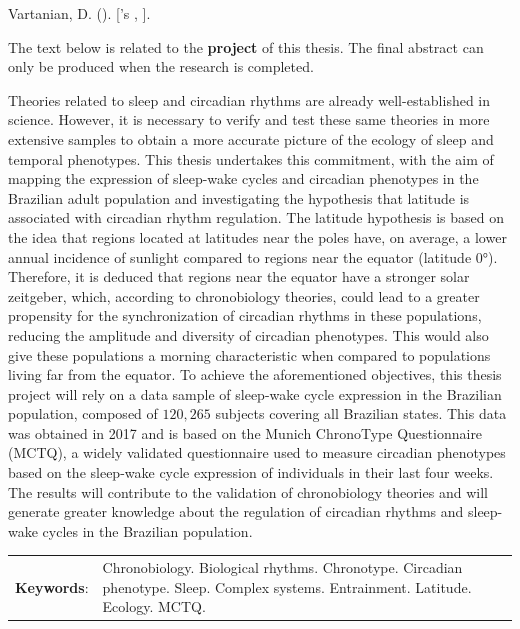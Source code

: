 \documentclass[
12pt,
openright,
oneside,
a4paper,
chapter=TITLE,
section=TITLE,
french,
spanish,
brazil,
english
]{abntex2}\usepackage{array}
\renewcommand{\resumoname}{Abstract}
\renewcommand{\resumoname}{Resumo}
\renewcommand{\resumoname}{Resumen}
\renewcommand{\resumoname}{Résumé}
\providecommand{\imprimiruniversidade}{}
\providecommand{\imprimirtipodetituloacademico}{}
\newenvironment{resumoenv}[1][\resumoname]{
  \pretextualchapter{#1}
  \begingroup
  \setlength{\parindent}{0cm}
  \setlength{\parskip}{\smallskipamount} %
  \AtBeginEnvironment{tabular}{\normalsize}
  \renewcommand{\arraystretch}{1}
  \setlength{\aboverulesep}{0ex}
  \setlength{\belowrulesep}{0ex}
  \setlength{\arrayrulewidth}{0pt}
  \setlength{\tabcolsep}{0cm}
  \vspace{-\smallskipamount} %
  \begin{SingleSpace}
}{
  \end{SingleSpace}
  \cleardoublepage
  \endgroup
}
\begin{document}
\begin{resumoenv}[\resumoname]
Vartanian, D. ({\imprimirdata}). \textit{\imprimirtitulo} [{\imprimirtipodetituloacademico}'s {\imprimirtipotrabalho}, {\imprimiruniversidade}].


The text below is related to the \textbf{project} of this thesis. The
final abstract can only be produced when the research is completed.

Theories related to sleep and circadian rhythms are already
well-established in science. However, it is necessary to verify and test
these same theories in more extensive samples to obtain a more accurate
picture of the ecology of sleep and temporal phenotypes. This thesis
undertakes this commitment, with the aim of mapping the expression of
sleep-wake cycles and circadian phenotypes in the Brazilian adult
population and investigating the hypothesis that latitude is associated
with circadian rhythm regulation. The latitude hypothesis is based on
the idea that regions located at latitudes near the poles have, on
average, a lower annual incidence of sunlight compared to regions near
the equator (latitude 0°). Therefore, it is deduced that regions near
the equator have a stronger solar zeitgeber, which, according to
chronobiology theories, could lead to a greater propensity for the
synchronization of circadian rhythms in these populations, reducing the
amplitude and diversity of circadian phenotypes. This would also give
these populations a morning characteristic when compared to populations
living far from the equator. To achieve the aforementioned objectives,
this thesis project will rely on a data sample of sleep-wake cycle
expression in the Brazilian population, composed of \(120,265\) subjects
covering all Brazilian states. This data was obtained in 2017 and is
based on the Munich ChronoType Questionnaire (MCTQ), a widely validated
questionnaire used to measure circadian phenotypes based on the
sleep-wake cycle expression of individuals in their last four weeks. The
results will contribute to the validation of chronobiology theories and
will generate greater knowledge about the regulation of circadian
rhythms and sleep-wake cycles in the Brazilian population.


\begin{tabular}{p{2.3cm} p{13.6cm}}
  \textbf{Keywords}: & Chronobiology. Biological rhythms. Chronotype. Circadian phenotype. Sleep. Complex systems. Entrainment. Latitude. Ecology. MCTQ.
\end{tabular}
\end{resumoenv}
\end{document}
